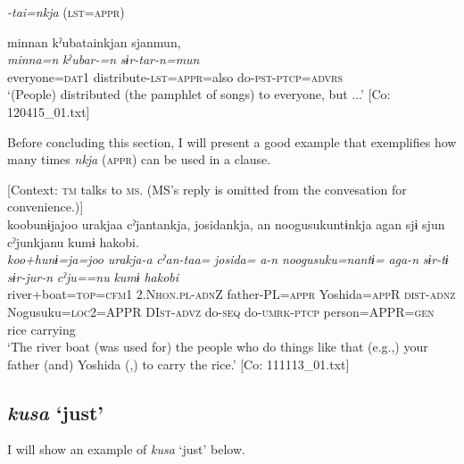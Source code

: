 \begin{xlist}
  \exi{} \textit{{}-tai=nkja} (\textsc{lst}=\textsc{appr})

  \ex  %
      \glll    minnan  kˀubatainkjan  sjanmun,\\
      \textit{minna=n}  \textit{kˀubar-=n}  \textit{sɨr-tar-n=mun}\\
      everyone=\textsc{dat}1  distribute-\textsc{lst}=\textsc{appr}=also  do-\textsc{pst}-\textsc{ptcp}=\textsc{advrs}\\
      \glt       ‘(People) distributed (the pamphlet of songs) to everyone, but ...’ [Co: 120415\_01.txt]
  \end{xlist}
\z

  Before concluding this section, I will present a good example that exemplifies how many times \textit{nkja} (\textsc{appr}) can be used in a clause.

\ea\label{ex:10.27}   [Context: \textsc{tm} talks to \textsc{ms}. (MS’s reply is omitted from the convesation for convenience.)]\\
      \glll    koobunɨjajoo  urakjaa  cˀjantankja,  josidankja,  an  noogusukuntɨnkja  agan  sjɨ  sjun  cˀjunkjanu  kumɨ  {\textbar}hakobi{\textbar}.\\
    \textit{koo+hunɨ=ja=joo}  \textit{urakja-a}  \textit{cˀan-taa=}  \textit{josida=}  \textit{a-n}  \textit{noogusuku=nantɨ=}  \textit{aga-n}  \textit{sɨr-tɨ}  \textit{sɨr-jur-n}  \textit{cˀju==nu}  \textit{kumɨ}  \textit{hakobi}\\
    river+boat=\textsc{top}=\textsc{cfm}1  2.N\textsc{hon}.\textsc{pl}-\textsc{adn}Z  father-PL=\textsc{appr}  Yoshida=\textsc{app}R  \textsc{dist}-\textsc{adnz}  Nogusuku=\textsc{loc}2=APPR  DI\textsc{st}-\textsc{advz}  do-\textsc{seq}  do-\textsc{umrk}-\textsc{ptcp}  person=APPR=\textsc{gen}  rice  carrying\\
\glt     ‘The river boat (was used for) the people who do things like that (e.g.,) your father (and) Yoshida (,) to carry the rice.’  [Co: 111113\_01.txt]
\z

\subsection{\textit{kusa} ‘just’}\label{sec:10.1.7}

I will show an example of \textit{kusa} ‘just’ below.

